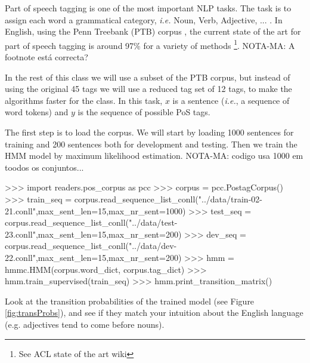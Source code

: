 Part of speech tagging is one of the most important NLP tasks. The
task is to assign each word a grammatical category, \emph{i.e.} Noun,
Verb, Adjective, ... . In English, using the Penn Treebank (PTB) corpus \citep{pennTreeBank}, the current
state of the art for part of speech tagging is around 97\% for a
variety of methods \footnote{See ACL state of the art wiki}. 
NOTA-MA: A footnote está correcta?

In the rest of this class we will use a subset of the PTB corpus, but
instead of using the original 45 tags we will use a reduced tag set of
12 tags, to make the algorithms faster for the
class. In this task, $x$ is a sentence (\emph{i.e.}, a sequence of word tokens) and $y$
is the sequence of possible PoS tags.

The first step is to load the corpus. We will start by loading
1000 sentences for training and 200 sentences both for development and
testing. Then we train the HMM model by maximum likelihood estimation.
NOTA-MA: codigo usa 1000 em toodos os conjuntos... 
\begin{python}
>>> import readers.pos_corpus as pcc
>>> corpus = pcc.PostagCorpus()
>>> train_seq = corpus.read_sequence_list_conll("../data/train-02-21.conll",max_sent_len=15,max_nr_sent=1000)
>>> test_seq = corpus.read_sequence_list_conll("../data/test-23.conll",max_sent_len=15,max_nr_sent=200)
>>> dev_seq = corpus.read_sequence_list_conll("../data/dev-22.conll",max_sent_len=15,max_nr_sent=200)
>>> hmm = hmmc.HMM(corpus.word_dict, corpus.tag_dict)
>>> hmm.train_supervised(train_seq)
>>> hmm.print_transition_matrix()
\end{python}


Look at the transition probabilities of the trained model
 (see
Figure \ref{fig:transProbs}), and see if they match your intuition
about the English language (e.g. adjectives tend to come before nouns).

